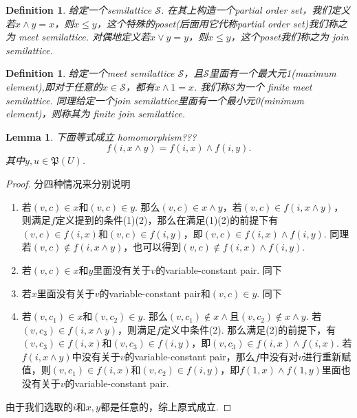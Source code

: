 \documentclass{article}
\newtheorem{lemma}[theorem]{Lemma}
\newtheorem{definition}[theorem]{Definition}
\begin{document}
\begin{definition}
\rm 给定一个semilattice $\mathcal{S}$. 在其上构造一个partial order set，我们定义若$x \wedge y = x$，则$x \leq y$，这个特殊的poset(后面用它代称partial order set)我们称之为{\color{red} meet semilattice}. 对偶地定义若$x \vee y = y$，则$x \leq y$，这个poset我们称之为{ \color{red} join semilattice}.
\end{definition}

\begin{definition}
\rm 给定一个meet semilattice $\mathcal{S}$，且$\mathcal{S}$里面有一个最大元1(maximum element),即对于任意的$x \in \mathcal{S}$，都有$x \wedge 1 = x$. 我们称$\mathcal{S}$为一个{\color{red} finite meet semilattice}. 同理给定一个join semilattice里面有一个最小元0(minimum element)，则称其为{\color{red} finite join semilattice}.
\end{definition}

\begin{lemma}
\rm 下面等式成立 homomorphism???
$$
f(i,x \wedge y) = f(i,x) \wedge f(i,y).
$$
其中$y,u \in \mathfrak{P}(U)$.
\end{lemma}

\begin{proof}
\rm 分四种情况来分别说明
\begin{enumerate}
	\item 若$(v,c) \in x$和$(v,c) \in y$. 那么$(v,c) \in x \wedge y$，若$(v,c) \in f(i,x \wedge y)$，则满足$f$定义提到的条件(1)(2)，那么在满足(1)(2)的前提下有$(v,c) \in f(i,x)$和$(v,c) \in f(i,y)$，即$(v,c) \in f(i,x) \wedge f(i,y)$. 同理若$(v,c) \notin f(i,x \wedge y)$，也可以得到$(v,c) \notin f(i,x) \wedge f(i,y)$.
	\item 若$(v,c) \in x$和$y$里面没有关于$v$的variable-constant pair. 同下
	\item 若$x$里面没有关于$v$的variable-constant pair和$(v,c) \in y$. 同下
	\item 若$(v,c_1) \in x$和$(v,c_2) \in y$. 那么$(v,c_1) \notin x \wedge$且$(v,c_2) \notin x \wedge y$. 若$(v,c_3) \in f(i,x \wedge y)$，则满足$f$定义中条件(2). 那么满足(2)的前提下，有$(v,c_3) \in f(i,x)$和$(v,c_3) \in f(i,y)$，即$(v,c_3) \in f(i,x) \wedge f(i,x)$. 若$f(i,x \wedge y)$中没有关于$v$的variable-constant pair，那么$f$中没有对$v$进行重新赋值，则$(v,c_1) \in f(i,x)$和$(v,c_2) \in f(i,y)$，即$f(1,x) \wedge f(1,y)$里面也没有关于$v$的variable-constant pair.
\end{enumerate}
由于我们选取的$i$和$x,y$都是任意的，综上原式成立.
\end{proof}
\end{document}
